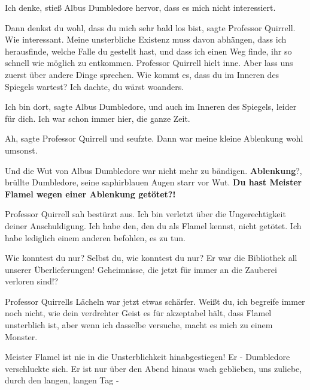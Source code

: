 \glqq{}Ich denke\grqq{}, stieß Albus Dumbledore hervor, \glqq{}dass es mich nicht
interessiert.\grqq{}

\glqq{}Dann denkst du wohl, dass du mich sehr bald los bist\grqq{}, sagte
Professor Quirrell. \glqq{}Wie interessant. Meine unsterbliche Existenz muss
davon abhängen, dass ich herausfinde, welche Falle du gestellt hast, und dass
ich einen Weg finde, ihr so schnell wie möglich zu entkommen.\grqq{} Professor
Quirrell hielt inne. \glqq{}Aber lass uns zuerst über andere Dinge sprechen. Wie
kommt es, dass du im Inneren des Spiegels wartest? Ich dachte, du wärst
woanders.\grqq{}

\glqq{}Ich bin dort\grqq{}, sagte Albus Dumbledore, \glqq{}und auch im Inneren des
Spiegels, leider für dich. Ich war schon immer hier, die ganze Zeit.\grqq{}

\glqq{}Ah\grqq{}, sagte Professor Quirrell und seufzte. \glqq{}Dann war meine
kleine Ablenkung wohl umsonst.\grqq{}

Und die Wut von Albus Dumbledore war nicht mehr zu bändigen. \glqq{}
\textbf{Ablenkung}?\grqq{}, brüllte Dumbledore, seine saphirblauen Augen starr
vor Wut. \glqq{}\textbf{Du hast Meister Flamel wegen einer Ablenkung
getötet?!}\grqq{}

Professor Quirrell sah bestürzt aus. \glqq{}Ich bin verletzt über die
Ungerechtigkeit deiner Anschuldigung. Ich habe den, den du als Flamel kennst,
nicht getötet. Ich habe lediglich einem anderen befohlen, es zu tun.\grqq{}

\glqq{}Wie konntest du nur? Selbst du, wie konntest du nur? Er war die Bibliothek
all unserer Überlieferungen! Geheimnisse, die jetzt für immer an die Zauberei
verloren sind!?\grqq{}

Professor Quirrells Lächeln war jetzt etwas schärfer. \glqq{}Weißt du, ich
begreife immer noch nicht, wie dein verdrehter Geist es für akzeptabel hält,
dass Flamel unsterblich ist, aber wenn ich dasselbe versuche, macht es mich zu
einem Monster.\grqq{}

\glqq{}Meister Flamel ist nie in die Unsterblichkeit hinabgestiegen! Er -\grqq{}
Dumbledore verschluckte sich. \glqq{}Er ist nur über den Abend hinaus wach
geblieben, uns zuliebe, durch den langen, langen Tag -\grqq{}

